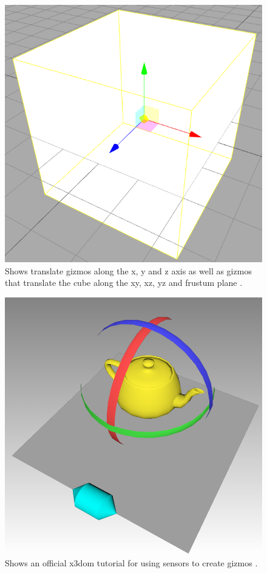 \begin{figure}[]
  \centering
  \includegraphics[width=12cm]{../assets/threejs-editor.png}
	\caption{ Shows translate gizmos along the x, y and z axis as well as gizmos that translate the cube along the xy, xz, yz and frustum plane \cite{threejseditor}.}
\end{figure}
\begin{figure}[]
  \centering
  \includegraphics[width=12cm]{../assets/x3dom-gizmo-example.png}
	\caption{ Shows an official x3dom tutorial for using sensors to create gizmos \cite{x3dgizmo}. }
	\label{fig:x3dgizmo}
\end{figure}

